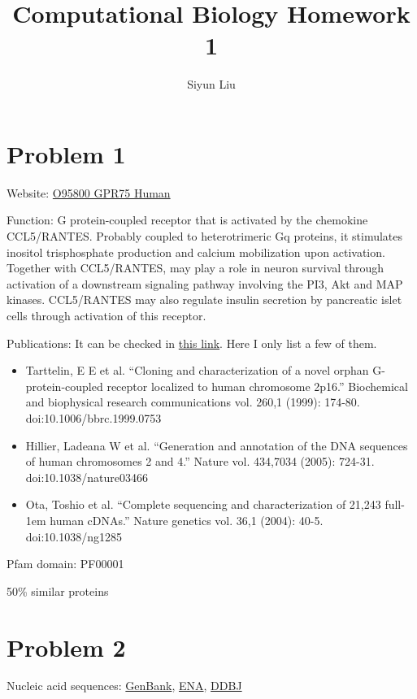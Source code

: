\documentclass{article}
\title{Computational Biology Homework 1}
\author{Siyun Liu}
\date{}
\begin{document}
\maketitle

\section{Problem 1}

Website: \href{https://www.uniprot.org/uniprotkb/O95800/entry}{O95800 GPR75 Human}

Function: G protein-coupled receptor that is activated by the chemokine CCL5/RANTES. Probably coupled to heterotrimeric Gq proteins, it stimulates inositol trisphosphate production and calcium mobilization upon activation. Together with CCL5/RANTES, may play a role in neuron survival through activation of a downstream signaling pathway involving the PI3, Akt and MAP kinases. CCL5/RANTES may also regulate insulin secretion by pancreatic islet cells through activation of this receptor.

Publications: It can be checked in \href{https://www.uniprot.org/uniprotkb/O95800/publications}{this link}. Here I only list a few of them.

\begin{itemize}
    \item Tarttelin, E E et al. “Cloning and characterization of a novel orphan G-protein-coupled receptor localized to human chromosome 2p16.” Biochemical and biophysical research communications vol. 260,1 (1999): 174-80. doi:10.1006/bbrc.1999.0753
    \item Hillier, Ladeana W et al. “Generation and annotation of the DNA sequences of human chromosomes 2 and 4.” Nature vol. 434,7034 (2005): 724-31. doi:10.1038/nature03466
    \item Ota, Toshio et al. “Complete sequencing and characterization of 21,243 full-1em human cDNAs.” Nature genetics vol. 36,1 (2004): 40-5. doi:10.1038/ng1285
\end{itemize}

Pfam domain: PF00001

50\% similar proteins


\section{Problem 2}

Nucleic acid sequences: \href{https://www.ncbi.nlm.nih.gov/genbank/}{GenBank}, \href{https://www.ebi.ac.uk/ena/browser/home}{ENA}, \href{https://www.ddbj.nig.ac.jp/index-e.html}{DDBJ}
\end{document}
